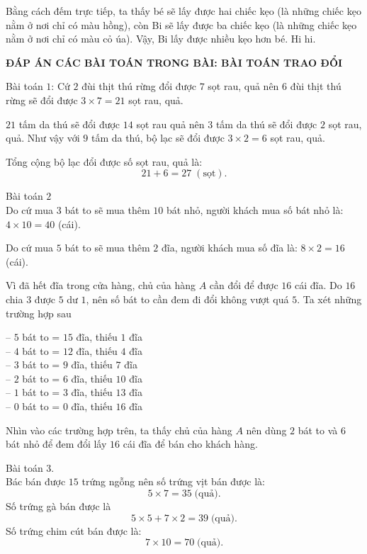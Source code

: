 Bằng cách đếm trực tiếp, ta thấy bé sẽ lấy được hai chiếc kẹo (là những chiếc kẹo nằm ở nơi chỉ có màu hồng), còn Bi sẽ lấy được ba chiếc kẹo (là những chiếc kẹo nằm ở nơi chỉ có màu cỏ úa). Vậy, Bi lấy được nhiều kẹo hơn bé. Hi hi. 
\newpage
\begin{center}
	\textbf{\color{toancuabi}ĐÁP ÁN CÁC BÀI TOÁN TRONG BÀI: BÀI TOÁN TRAO ĐỔI}
\end{center}
Bài toán $1$: Cứ $2$ đùi thịt thú rừng đổi được $7$ sọt rau, quả nên $6$ đùi thịt thú rừng sẽ đổi được $3\times 7=21$ sọt rau, quả.%

$21$ tấm da thú sẽ đổi được $14$ sọt rau quả nên $3$ tấm da thú sẽ đổi được $2$ sọt rau, quả. Như vậy với $9$ tấm da thú, bộ lạc sẽ đổi được $3\times 2= 6$ sọt rau, quả. %

Tổng cộng bộ lạc đổi được số sọt rau, quả là: $$21+6=27 \;(\text{sọt}).$$

Bài toán $2$\\
Do cứ mua $3$ bát to sẽ mua thêm $10$ bát nhỏ, người khách mua số bát nhỏ là:  $4\times 10= 40$ (cái).

Do cứ mua $5$ bát to sẽ mua thêm $2$ đĩa, người khách mua số đĩa là: $ 8\times 2= 16$ (cái).

Vì đã hết đĩa trong cửa hàng, chủ của hàng $A$ cần đổi để được $16$ cái đĩa. Do $16$ chia $3$ được $5$ dư $1$, nên số bát to cần đem đi đổi không vượt quá $5$. Ta xét những trường hợp sau

--	$5$ bát to  =  $15$ đĩa, thiếu $1$ đĩa\\
--	$4$ bát to  =   $12$ đĩa, thiếu $4$ đĩa\\
--	$3$ bát to = $9$ đĩa, thiếu $7$ đĩa\\
--	$2$ bát to = $6$ đĩa, thiếu $10$ đĩa\\
--	$1$ bát to = $3$ đĩa, thiếu $13$ đĩa\\
--	$0$ bát to = $0$ đĩa, thiếu $16$ đĩa

Nhìn vào các trường hợp trên, ta thấy chủ của hàng $A$ nên dùng $2$ bát to và $6$ bát nhỏ để đem đổi lấy $16$ cái đĩa để bán cho khách hàng.

Bài toán $3$.\\
Bác bán được $15$ trứng ngỗng nên số trứng vịt bán được là: 
$$5\times 7=35 \;\text{(quả)}.$$
Số trứng gà bán được là
$$5\times 5+ 7\times 2= 39 \;\text{(quả)}.$$
Số trứng chim cút bán được là:
$$7\times 10=70 \;\text{(quả)}.$$

